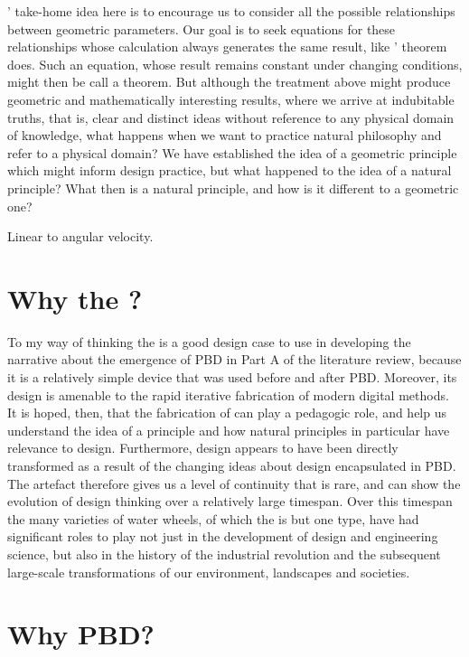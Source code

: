 \documentclass[a4paper, 12pt]{article}
\begin{document}
\citeauthor{descartes_principles_1982}' take-home idea here is to encourage us to consider all the possible relationships between geometric parameters. Our goal is to seek equations for these relationships whose calculation always generates the same result, like \citeauthor{descartes_principles_1982}' theorem does. Such an equation, whose result remains constant under changing conditions, might then be call a theorem. But although the treatment above might produce geometric and mathematically interesting results, where we arrive at indubitable truths, that is, clear and distinct ideas without reference to any physical domain of knowledge, what happens when we want to practice natural philosophy and refer to a physical domain? We have established the idea of a geometric principle which might inform design practice, but what happened to the idea of a natural principle? What then is a natural principle, and how is it different to a geometric one?


Linear to angular velocity. 
\citet[p.764]{jablokow_topological_1993}

\section{Why the \SE?} 
\label{sec:why:se}

To my way of thinking the \SEs is a good design case to use in developing the narrative about the emergence of PBD in Part A of the literature review, because it is a relatively simple device that was used before and after PBD. Moreover, its design is amenable to the rapid iterative fabrication of modern digital methods. It is hoped, then, that the fabrication of \SEs can play a pedagogic role, and help us understand the idea of a principle and how natural principles in particular have relevance to design. Furthermore, \SEs design appears to have been directly transformed as a result of the changing ideas about design encapsulated in PBD. The \SEs artefact therefore gives us a level of continuity that is rare, and can show the evolution of design thinking over a relatively large timespan. Over this timespan the many varieties of water wheels, of which the \SEs is but one type, have had significant roles to play not just in the development of design and engineering science, but also in the history of the industrial revolution and the subsequent large-scale transformations of our environment, landscapes and societies. 

\section{Why PBD?} 
\label{sec:why:pbd}
\end{document}

